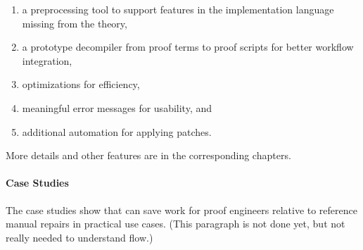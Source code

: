 \begin{enumerate}
\item a preprocessing tool to support features in the implementation language missing from the theory,
\item a prototype decompiler from proof terms to proof scripts for better workflow integration,
\item optimizations for efficiency,
\item meaningful error messages for usability, and
\item additional automation for applying patches. 
\end{enumerate}
More details and other features are in the corresponding chapters. %

\paragraph{Case Studies}
The case studies show that \sysnamelong can save work for proof engineers relative to reference manual repairs in practical use cases. %
(This paragraph is not done yet, but not really needed to understand flow.)



